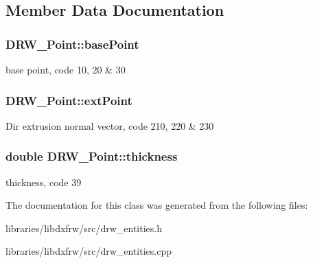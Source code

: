 \subsection{Member Data Documentation}
\hypertarget{classDRW__Point_afaa15dc45c45d9057257e478c9746169}{
\subsubsection[{base\-Point}]{ D\-R\-W\-\_\-\-Point\-::base\-Point}}\label{classDRW__Point_afaa15dc45c45d9057257e478c9746169}
base point, code 10, 20 \& 30 \hypertarget{classDRW__Point_ab55e32170a648e8469844c886ff56fc7}{
\subsubsection[{ext\-Point}]{ D\-R\-W\-\_\-\-Point\-::ext\-Point}}\label{classDRW__Point_ab55e32170a648e8469844c886ff56fc7}
Dir extrusion normal vector, code 210, 220 \& 230 \hypertarget{classDRW__Point_a909f6f2623e3b5cf40393636f3119954}{
\subsubsection[{thickness}]{\setlength{\rightskip}{0pt plus 5cm}double D\-R\-W\-\_\-\-Point\-::thickness}}\label{classDRW__Point_a909f6f2623e3b5cf40393636f3119954}
thickness, code 39 

The documentation for this class was generated from the following files\-:\begin{DoxyCompactItemize}
\item 
libraries/libdxfrw/src/drw\-\_\-entities.\-h\item 
libraries/libdxfrw/src/drw\-\_\-entities.\-cpp\end{DoxyCompactItemize}
